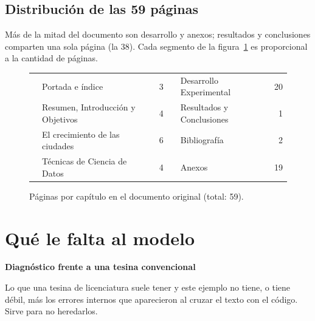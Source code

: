 \documentclass[12pt,a4paper,oneside]{report}
\newcommand{\meta}[2]{%
  \par\noindent{\small\sffamily\color{gris}#1}\hspace{1.2em}%
  {\small\sffamily\bfseries\color{acento}#2}\par\smallskip}
\begin{document}
\section{Distribución de las 59 páginas}

Más de la mitad del documento son desarrollo y anexos; resultados y conclusiones
comparten una sola página (la 38). Cada segmento de la figura~\ref{fig:paginas} es
proporcional a la cantidad de páginas.

\begin{figure}[h]
\centering
{}

\vspace{6pt}
\small
\begin{tabular}{@{}l l r@{\qquad}l l r@{}}
\textcolor{bar6}{\rule{8pt}{8pt}} & Portada e índice & 3 &
\textcolor{bar1}{\rule{8pt}{8pt}} & Desarrollo Experimental & 20 \\
\textcolor{bar5}{\rule{8pt}{8pt}} & Resumen, Introducción y Objetivos & 4 &
\textcolor{bar3}{\rule{8pt}{8pt}} & Resultados y Conclusiones & 1 \\
\textcolor{bar2}{\rule{8pt}{8pt}} & El crecimiento de las ciudades & 6 &
\textcolor{bar5}{\rule{8pt}{8pt}} & Bibliografía & 2 \\
\textcolor{bar4}{\rule{8pt}{8pt}} & Técnicas de Ciencia de Datos & 4 &
\textcolor{bar6}{\rule{8pt}{8pt}} & Anexos & 19 \\
\end{tabular}
\caption{Páginas por capítulo en el documento original (total: 59).}
\label{fig:paginas}
\end{figure}

\chapter{Qué le falta al modelo}
\label{cap:faltantes}
\meta{14 puntos}{Diagnóstico frente a una tesina convencional}

Lo que una tesina de licenciatura suele tener y este ejemplo no tiene, o tiene débil,
más los errores internos que aparecieron al cruzar el texto con el código. Sirve para no
heredarlos.
\end{document}
